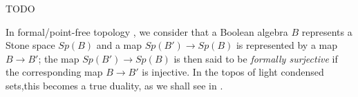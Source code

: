 TODO


In formal/point-free topology \cite{TODO}, 
we consider that a Boolean algebra $B$ represents a Stone space $Sp(B)$ and a map
$Sp(B') \to Sp(B)$ is represented by a map $B\rightarrow B'$; 
the map $Sp(B')\to Sp(B)$ is then said to be
{\em formally surjective} if the corresponding map $B\to B'$ is injective. 
In the topos of light condensed sets,this becomes a true duality, 
as we shall see in .
